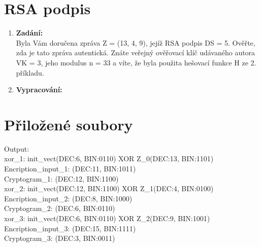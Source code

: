 \documentclass[10pt, a4paper]{article}%
\begin{document}
		\section*{\large{\textbf{RSA podpis}}}
		\begin{enumerate}
			\item \textbf{Zadání:}\\
				Byla Vám doručena zpráva Z = (13, 4, 9), jejíž RSA podpis DS = 5. Ověřte, zda je tato zpráva
				autentická. Znáte veřejný ověřovací klíč udávaného autora VK = 3, jeho modulus n = 33 a víte, že
				byla použita hešovací funkce H ze 2. příkladu.
			\item \textbf{Vypracování:}\\

		\end{enumerate}
	\section*{\large{\textbf{Přiložené soubory}}}
	
	Output:\\
	xor\_1: init\_vect(DEC:6, BIN:0110) XOR Z\_0(DEC:13, BIN:1101)\\
	Encription\_input\_1: (DEC:11, BIN:1011)\\
	Cryptogram\_1: (DEC:12, BIN:1100)\\
	xor\_2: init\_vect(DEC:12, BIN:1100) XOR Z\_1(DEC:4, BIN:0100)\\
	Encription\_input\_2: (DEC:8, BIN:1000)\\
	Cryptogram\_2: (DEC:6, BIN:0110)\\
	xor\_3: init\_vect(DEC:6, BIN:0110) XOR Z\_2(DEC:9, BIN:1001)\\
	Encription\_input\_3: (DEC:15, BIN:1111)\\
	Cryptogram\_3: (DEC:3, BIN:0011)
\end{document}
